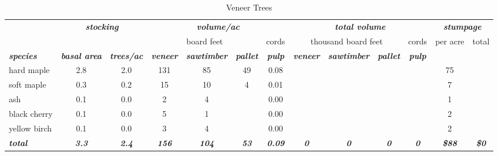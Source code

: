 \documentclass[landscape]{article}
\begin{document}
\begin{table}[H]

\caption{\label{tab:unnamed-chunk-4}Veneer Trees}
\fontsize{10}{12}\selectfont
\begin{tabular}[t]{lcccccccccccc}
\toprule
\multicolumn{1}{c}{\em{\textbf{ }}} & \multicolumn{2}{c}{\em{\textbf{stocking}}} & \multicolumn{4}{c}{\em{\textbf{volume/ac }}} & \multicolumn{4}{c}{\em{\textbf{total volume}}} & \multicolumn{2}{c}{\em{\textbf{stumpage}}} \\
\cmidrule(l{3pt}r{3pt}){2-3} \cmidrule(l{3pt}r{3pt}){4-7} \cmidrule(l{3pt}r{3pt}){8-11} \cmidrule(l{3pt}r{3pt}){12-13}
\multicolumn{3}{c}{ } & \multicolumn{3}{c}{board feet} & \multicolumn{1}{c}{cords} & \multicolumn{3}{c}{thousand board feet} & \multicolumn{1}{c}{cords} & \multicolumn{1}{c}{per acre} & \multicolumn{1}{c}{total} \\
\cmidrule(l{3pt}r{3pt}){4-6} \cmidrule(l{3pt}r{3pt}){7-7} \cmidrule(l{3pt}r{3pt}){8-10} \cmidrule(l{3pt}r{3pt}){11-11} \cmidrule(l{3pt}r{3pt}){12-12} \cmidrule(l{3pt}r{3pt}){13-13}
\rowcolor[HTML]{DCDCDC}  \em{\textbf{species}} & \em{\textbf{basal area}} & \em{\textbf{trees/ac}} & \em{\textbf{veneer}} & \em{\textbf{sawtimber}} & \em{\textbf{pallet}} & \em{\textbf{pulp}} & \em{\textbf{veneer}} & \em{\textbf{sawtimber}} & \em{\textbf{pallet}} & \em{\textbf{pulp}} & \em{\textbf{ }} & \em{\textbf{ }}\\
\midrule
\rowcolor{gray!6}  hard maple & 2.8 & 2.0 & 131 & 85 & 49 & 0.08 &  &  &  &  & 75 & \\
 
soft maple & 0.3 & 0.2 & 15 & 10 & 4 & 0.01 &  &  &  &  & 7 & \\
 
\rowcolor{gray!6}  ash & 0.1 & 0.0 & 2 & 4 &  & 0.00 &  &  &  &  & 1 & \\
 
black cherry & 0.1 & 0.0 & 5 & 1 &  & 0.00 &  &  &  &  & 2 & \\
 
\rowcolor{gray!6}  yellow birch & 0.1 & 0.0 & 3 & 4 &  & 0.00 &  &  &  &  & 2 & \\
 
\rowcolor[HTML]{DCDCDC}  \em{\textbf{total}} & \em{\textbf{3.3}} & \em{\textbf{2.4}} & \em{\textbf{156}} & \em{\textbf{104}} & \em{\textbf{53}} & \em{\textbf{0.09}} & \em{\textbf{0}} & \em{\textbf{0}} & \em{\textbf{0}} & \em{\textbf{0}} & \em{\textbf{\$88}} & \em{\textbf{\$0}}\\
\bottomrule
\end{tabular}
\end{table}
\end{document}
